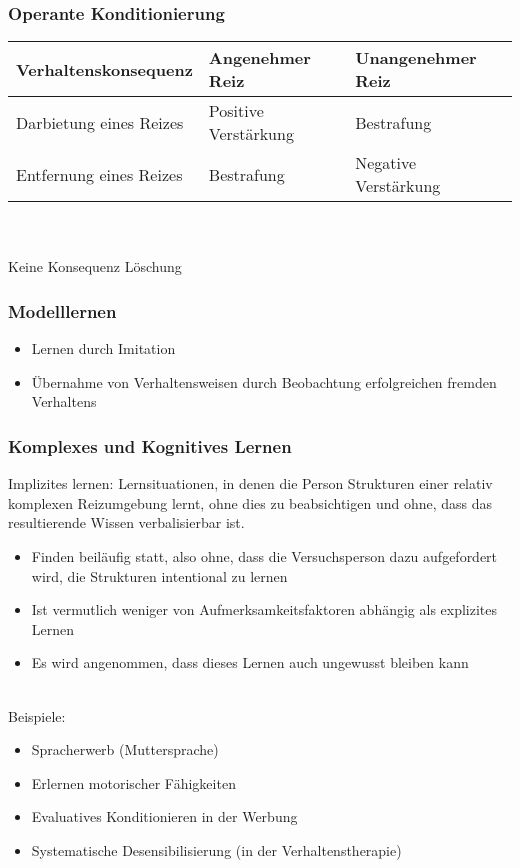 \documentclass[a4paper]{article}
\begin{document}
\subsubsection{Operante Konditionierung}
\begin{tabular}{ p{4.5cm} p{4.5cm} p{4.5cm} }\toprule[1.5pt]
	Verhaltenskonsequenz
	& Angenehmer Reiz
	& Unangenehmer Reiz
	\\ \midrule
	
	Darbietung eines Reizes
	& Positive Verstärkung
	& Bestrafung
	\\
	
	Entfernung eines Reizes
	& Bestrafung
	& Negative Verstärkung
	\\
	
	\bottomrule[1.5pt]
\end{tabular}
\\~\\
Keine Konsequenz \textrightarrow Löschung

\subsubsection{Modelllernen}
\begin{itemize}
	\item Lernen durch Imitation
	\item Übernahme von Verhaltensweisen durch Beobachtung erfolgreichen fremden Verhaltens
\end{itemize}

\subsubsection{Komplexes und Kognitives Lernen}
Implizites lernen: Lernsituationen, in denen die Person Strukturen einer relativ komplexen Reizumgebung lernt, ohne dies zu beabsichtigen und ohne, dass das resultierende Wissen verbalisierbar ist.

\begin{itemize}
	\item Finden beiläufig statt, also ohne, dass die Versuchsperson dazu aufgefordert wird, die Strukturen intentional zu lernen
	\item Ist vermutlich weniger von Aufmerksamkeitsfaktoren abhängig als explizites Lernen
	\item Es wird angenommen, dass dieses Lernen auch ungewusst bleiben kann
\end{itemize}
~\\
Beispiele:
\begin{itemize}
	\item Spracherwerb (Muttersprache)
	\item Erlernen motorischer Fähigkeiten
	\item Evaluatives Konditionieren in der Werbung
	\item Systematische Desensibilisierung (in der Verhaltenstherapie)
\end{itemize}
\end{document}
